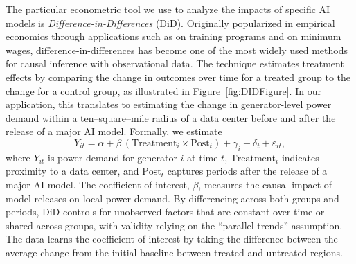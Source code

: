 \documentclass[sigconf,authordraft]{acmart}
\begin{document}
The particular econometric tool we use to analyze the impacts of specific AI models is \textit{Difference-in-Differences} (DiD). Originally popularized in empirical economics through applications such as \cite{card2022design} on training programs and \cite{card1994comment} on minimum wages, difference-in-differences has become one of the most widely used methods for causal inference with observational data. The technique estimates treatment effects by comparing the change in outcomes over time for a treated group to the change for a control group, as illustrated in Figure~\ref{fig:DIDFigure}. In our application, this translates to estimating the change in generator-level power demand within a ten--square--mile radius of a data center before and after the release of a major AI model. Formally, we estimate
\begin{equation}
    Y_{it} = \alpha + \beta \,(\text{Treatment}_i \times \text{Post}_t) + \gamma_i + \delta_t + \varepsilon_{it},
    \label{eq:DiD}
\end{equation}
where $Y_{it}$ is power demand for generator $i$ at time $t$, $\text{Treatment}_i$ indicates proximity to a data center, and $\text{Post}_t$ captures periods after the release of a major AI model. The coefficient of interest, $\beta$, measures the causal impact of model releases on local power demand. By differencing across both groups and periods, DiD controls for unobserved factors that are constant over time or shared across groups, with validity relying on the ``parallel trends'' assumption. The data learns the coefficient of interest by taking the difference between the average change from the initial baseline between treated and untreated regions. %

\end{document}
